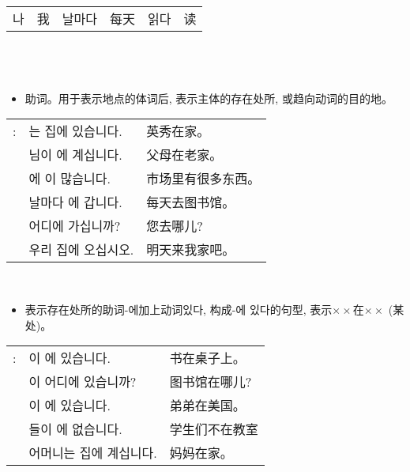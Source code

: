 \begin{tabular}{ll|ll|ll}
    나 &我 &날마다 &每天 &읽다 &读
\end{tabular}\\
\section{\kr{}}
\begin{grammar}
    \begin{grammarsect}[\kr -에]
        \begin{itemize}
            \item 助词。用于表示地点的体词后, 表示主体的存在处所, 或趋向动词的目的地。
        \end{itemize}
        \begin{tabular}{lll}
            \kr\ruby{例}{예}:& \kr\ruby{英秀}{영수}는 집에 있습니다.&英秀在家。\\
            &\kr\ruby{父母}{부모}님이 \ruby{故鄉}{고향}에 계십니다.&父母在老家。\\
            &\kr\ruby{市場}{시장}에 \ruby{物件}{물건}이 많습니다.&市场里有很多东西。\\
            &\kr 날마다 \ruby{圖書館}{도서관}에 갑니다.&每天去图书馆。\\
            &\kr 어디에 가십니까?&您去哪儿?\\
            &\kr\ruby{來日}{내일} 우리 집에 오십시오.&明天来我家吧。
        \end{tabular}\\
        \begin{itemize}
            \item 表示存在处所的助词{\kr-에}加上动词{\kr 있다}, 构成{\kr -에 있다}的句型, 表示$\times \times$在$\times \times$ (某处)。
        \end{itemize}
        \begin{tabular}{lll}
            \kr \ruby{例}{예}:&\kr \ruby{冊}{책}이 \ruby{冊床}{책상}에 있습니다.&书在桌子上。\\ 
            &\kr \ruby{圖書館}{도서관}이 어디에 있습니까?&图书馆在哪儿?\\
            &\kr \ruby{同生}{동생}이 \ruby{美國}{미국}에 있습니다.&弟弟在美国。\\
            &\kr \ruby{學生}{학생}들이 \ruby{教室}{교실}에 없습니다.&学生们不在教室\\
            &\kr 어머니는 집에 계십니다.&妈妈在家。\\
        \end{tabular}\\

\end{grammarsect}
\end{grammar}
